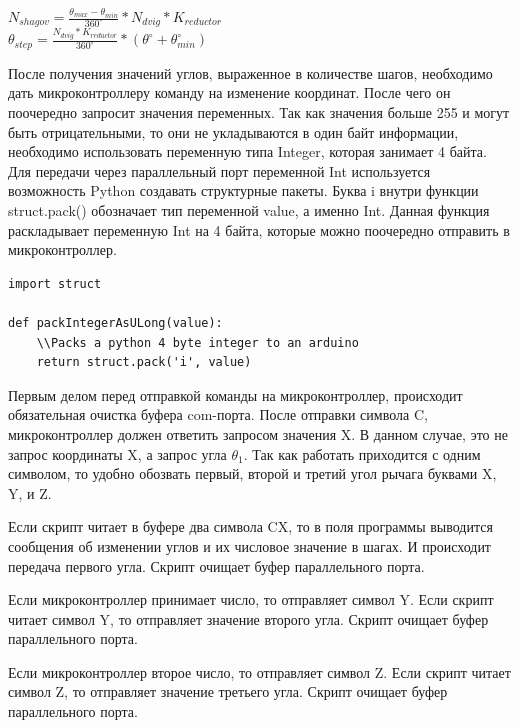 \begin{center}
    $N_{shagov} = \frac{\theta_{max} - \theta_{min} }{360^{\circ}}* N_{dvig} * K_{reductor} $\\
    \vspace{0.5cm}
    $\theta_{step} = \frac{N_{dvig} * K_{reductor}}{360^{\circ}}*(\theta^{\circ} + \theta^{\circ}_{min})$

\end{center}

После получения значений углов, выраженное в количестве шагов, необходимо дать микроконтроллеру команду на изменение координат. После чего он поочередно запросит значения переменных. Так как значения больше 255 и могут быть отрицательными, то они не укладываются в один байт информации, необходимо использовать переменную типа Integer, которая занимает 4 байта. Для передачи через параллельный порт переменной Int используется возможность Python создавать структурные пакеты. Буква i внутри функции struct.pack() обозначает тип переменной value, а именно Int. Данная функция раскладывает переменную Int на 4 байта, которые можно поочередно отправить в микроконтроллер.  

\begin{lstlisting}[style=python,caption=Преобразование Int в пакет]
import struct

def packIntegerAsULong(value):
    \\Packs a python 4 byte integer to an arduino
    return struct.pack('i', value)

\end{lstlisting}

Первым делом перед отправкой команды на микроконтроллер, происходит обязательная очистка буфера com-порта. После отправки символа C, микроконтроллер должен ответить запросом значения X. В данном случае, это не запрос координаты X, а запрос угла $\theta_{1}$. Так как работать приходится с одним символом, то удобно обозвать первый, второй и третий угол рычага буквами X, Y, и Z. 

Если скрипт читает в буфере два символа CX, то в поля программы выводится сообщения об изменении углов и их числовое значение в шагах. И происходит передача первого угла. Скрипт очищает буфер параллельного порта.

Если микроконтроллер принимает число, то отправляет символ Y. Если скрипт читает символ Y, то отправляет значение второго угла. Скрипт очищает буфер параллельного порта.

Если микроконтроллер второе число, то отправляет символ Z. Если скрипт читает символ Z, то отправляет значение третьего угла. Скрипт очищает буфер параллельного порта.

